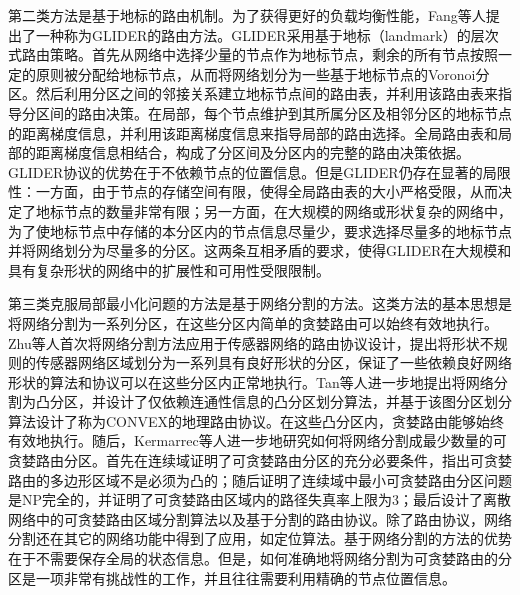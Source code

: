 第二类方法是基于地标的路由机制。为了获得更好的负载均衡性能，Fang等人提出了一种称为GLIDER的路由方法。GLIDER采用基于地标（landmark）的层次式路由策略。首先从网络中选择少量的节点作为地标节点，剩余的所有节点按照一定的原则被分配给地标节点，从而将网络划分为一些基于地标节点的Voronoi分区。然后利用分区之间的邻接关系建立地标节点间的路由表，并利用该路由表来指导分区间的路由决策。在局部，每个节点维护到其所属分区及相邻分区的地标节点的距离梯度信息，并利用该距离梯度信息来指导局部的路由选择。全局路由表和局部的距离梯度信息相结合，构成了分区间及分区内的完整的路由决策依据。GLIDER协议的优势在于不依赖节点的位置信息。但是GLIDER仍存在显著的局限性：一方面，由于节点的存储空间有限，使得全局路由表的大小严格受限，从而决定了地标节点的数量非常有限；另一方面，在大规模的网络或形状复杂的网络中，为了使地标节点中存储的本分区内的节点信息尽量少，要求选择尽量多的地标节点并将网络划分为尽量多的分区。这两条互相矛盾的要求，使得GLIDER在大规模和具有复杂形状的网络中的扩展性和可用性受限限制。

第三类克服局部最小化问题的方法是基于网络分割的方法。这类方法的基本思想是将网络分割为一系列分区，在这些分区内简单的贪婪路由可以始终有效地执行。Zhu等人首次将网络分割方法应用于传感器网络的路由协议设计，提出将形状不规则的传感器网络区域划分为一系列具有良好形状的分区，保证了一些依赖良好网络形状的算法和协议可以在这些分区内正常地执行。Tan等人进一步地提出将网络分割为凸分区，并设计了仅依赖连通性信息的凸分区划分算法，并基于该图分区划分算法设计了称为CONVEX的地理路由协议。在这些凸分区内，贪婪路由能够始终有效地执行。随后，Kermarrec等人进一步地研究如何将网络分割成最少数量的可贪婪路由分区。首先在连续域证明了可贪婪路由分区的充分必要条件，指出可贪婪路由的多边形区域不是必须为凸的；随后证明了连续域中最小可贪婪路由分区问题是NP完全的，并证明了可贪婪路由区域内的路径失真率上限为3；最后设计了离散网络中的可贪婪路由区域分割算法以及基于分割的路由协议。除了路由协议，网络分割还在其它的网络功能中得到了应用，如定位算法。基于网络分割的方法的优势在于不需要保存全局的状态信息。但是，如何准确地将网络分割为可贪婪路由的分区是一项非常有挑战性的工作，并且往往需要利用精确的节点位置信息。

